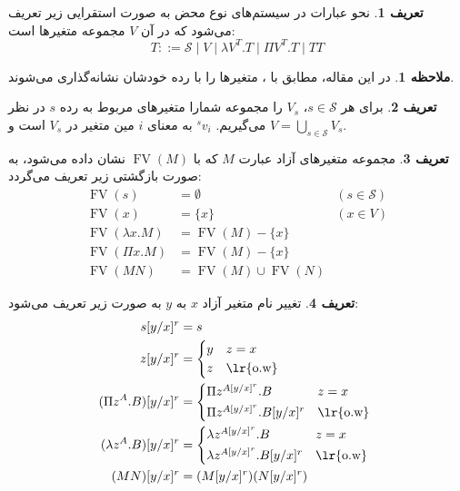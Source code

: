 \documentclass[11pt,twocolumn,a4paper,twoside]{article}
\theoremstyle{definition}
\newtheorem{definition}{تعریف}[section]
\theoremstyle{theorem}
\theoremstyle{definition}
\theoremstyle{definition}
\theoremstyle{definition}
\theoremstyle{definition}
\newtheorem{remark}{ملاحظه}[section]
\theoremstyle{definition}
\begin{document}
\begin{definition}
نحو عبارات در سیستم‌های نوع محض به صورت استقرایی زیر تعریف می‌شود که در آن $V$ مجموعه متغیرها است:    
\vspace{-5pt}
\begin{equation*}
T ::= \mathcal{S} \mid V \mid \lambda V^T.T \mid \Pi V^T.T \mid TT
\end{equation*}
\end{definition}

\begin{remark}\label{sort_tag}
در این مقاله، مطابق با
\cite{mull2023}،
متغیرها را با رده خودشان نشانه‌گذاری می‌شوند.
\end{remark}

\begin{definition}
برای هر
$s \in \mathcal{S}$، 
$V_s$
را مجموعه شمارا متغیرهای مربوط به رده
$s$
در نظر می‌گیریم.
$^sv_i$
به معنای
$i$
مین متغیر در
$V_s$
است و
$V = \bigcup_{s \in \mathcal{S}}V_s$.
\end{definition}

\begin{definition}
مجموعه متغیرهای آزاد عبارت $M$ که با
$\operatorname{FV}(M)$
نشان داده می‌شود، به صورت بازگشتی زیر تعریف می‌گردد:
\vspace{-5pt}
\begin{align*}
\operatorname{FV}(s)&= \emptyset &(s \in \mathcal{S})\\
\operatorname{FV}(x)&=\{x\} &(x \in V)\\
\operatorname{FV}(\lambda x.M)&=\operatorname{FV}(M)-\{x\}\\
\operatorname{FV}(\Pi x.M)&=\operatorname{FV}(M)-\{x\}\\
\operatorname{FV}(MN)&=\operatorname{FV}(M) \cup \operatorname{FV}(N)
\end{align*}
\end{definition}

\begin{definition}
تغییر نام متغیر آزاد $x$ به $y$ به صورت زیر تعریف می‌شود:
\vspace{-5pt}
\begin{align*}
s[y/x]^r &= s\\
z[y/x]^r &=
\begin{cases*}
y &$z = x$\\
z &\text{\lr{o.w}}
\end{cases*}\\
(\Pi z^A.B)[y/x]^r &=
\begin{cases*}
\Pi z^{A[y/x]^r}.B &$z = x$\\
\Pi z^{A[y/x]^r}.B[y/x]^r &\text{\lr{o.w}}
\end{cases*}\\
(\lambda z^A.B)[y/x]^r &=
\begin{cases*}
\lambda z^{A[y/x]^r}.B &$z = x$\\
\lambda z^{A[y/x]^r}.B[y/x]^r &\text{\lr{o.w}}
\end{cases*}\\
(MN)[y/x]^r &= (M[y/x]^r)(N[y/x]^r)
\end{align*}
\end{definition}
\end{document}
